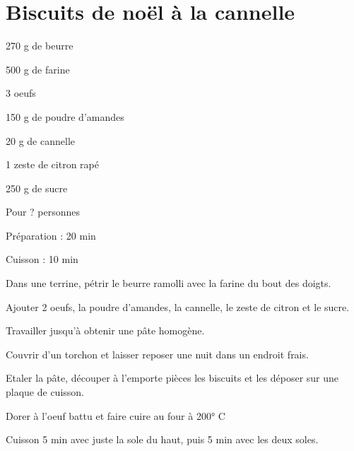 \section[\normalsize{Biscuits de noël à la cannelle}]{Biscuits de noël à la cannelle}

\begin{ingredients}
\item 270 g de beurre
\item 500 g de farine
\item 3 oeufs
\item 150 g de poudre d'amandes
\item 20 g de cannelle
\item 1 zeste de citron rap\'e
\item 250 g de sucre 
\end{ingredients}
\begin{infos}
\item Pour ? personnes
\item Préparation : 20 min
\item Cuisson : 10 min
\end{infos}
\begin{etapes}
\item Dans une terrine, p\'etrir le beurre ramolli avec la farine du bout des doigts. 
\item Ajouter 2 oeufs, la poudre d'amandes, la cannelle, le zeste de citron et le sucre. 
\item Travailler jusqu'\`a obtenir une p\^ate homog\`ene. 
\item Couvrir d'un torchon et laisser reposer une nuit dans un endroit frais.
\item Etaler la p\^ate, d\'ecouper \`a l'emporte pi\`eces les biscuits et les d\'eposer sur une plaque de cuisson. 
\item Dorer \`a l'oeuf battu et faire cuire au four \`a 200° C
\item Cuisson 5 min avec juste la sole du haut, puis 5 min avec les deux soles.
\end{etapes}
\begin{conseils}
\end{conseils}
